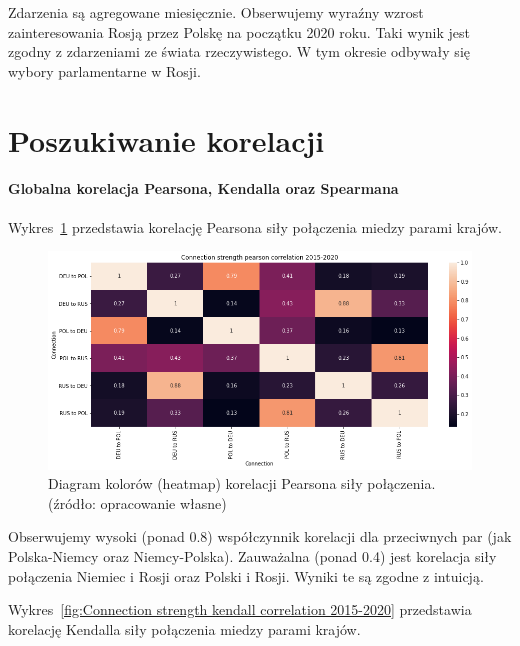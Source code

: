 \documentclass[11pt]{report}
\begin{document}
    Zdarzenia są agregowane miesięcznie.
    Obserwujemy wyraźny wzrost zainteresowania Rosją przez Polskę na początku 2020 roku.
    Taki wynik jest zgodny z zdarzeniami ze świata rzeczywistego.
    W tym okresie odbywały się wybory parlamentarne w Rosji.


    \section{Poszukiwanie korelacji}\label{sec:poszukiwanie-korelacji}

    \paragraph{Globalna korelacja Pearsona, Kendalla oraz Spearmana}
    Wykres~\ref{fig:Connection strength pearson correlation 2015-2020} przedstawia korelację Pearsona siły połączenia miedzy parami krajów.

    \begin{figure}[!ht]
        \centering
        \includegraphics[width=\linewidth]{../spade_proto/figures/correlation/Connection strength pearson correlation 2015-2020.png}
        \caption{Diagram kolorów (heatmap) korelacji Pearsona siły połączenia. (źródło: opracowanie własne)}
        \label{fig:Connection strength pearson correlation 2015-2020}
    \end{figure}

    Obserwujemy wysoki (ponad 0.8) współczynnik korelacji dla przeciwnych par (jak Polska-Niemcy oraz Niemcy-Polska).
    Zauważalna (ponad 0.4) jest korelacja siły połączenia Niemiec i Rosji oraz Polski i Rosji.
    Wyniki te są zgodne z intuicją.

    Wykres~\ref{fig:Connection strength kendall correlation 2015-2020} przedstawia korelację Kendalla siły połączenia miedzy parami krajów.
\end{document}

